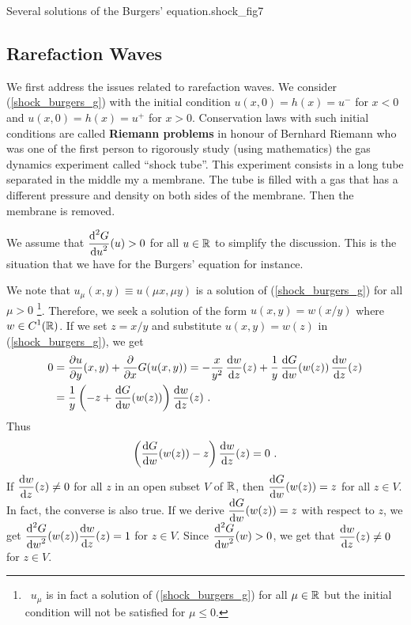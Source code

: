 {Several solutions of the Burgers' equation.}{shock_fig7}

\subsection{Rarefaction Waves} \label{subsectRarefW}

We first address the issues related to rarefaction waves.
We consider (\ref{shock_burgers_g}) with the initial condition
$\displaystyle u(x,0) = h(x) = u^-$ for $x<0$ and
$\displaystyle u(x,0) = h(x) = u^+$ for $x>0$.
Conservation laws with such initial conditions are called
{\bfseries Riemann problems}
in honour of Bernhard Riemann who was one of the first person to
rigorously study (using mathematics) the gas dynamics experiment
called ``shock tube''.  This experiment consists in a long tube
separated in the middle my a membrane.  The tube is filled with a gas
that has a different pressure and density on both sides of the
membrane.  Then the membrane is removed.

We assume that $\displaystyle \dydxn{G}{u}{2}(u) > 0$ for all $u\in
\RR$ to simplify the discussion.  This is the situation that we have
for the Burgers' equation for instance.

We note that $u_\mu(x,y) \equiv u(\mu x, \mu y)$ is a solution of
(\ref{shock_burgers_g}) for all $\mu >0$ \footnote{\ $u_\mu$ is in fact a
solution of (\ref{shock_burgers_g}) for all $\mu \in \RR$ but the
initial condition will not be satisfied for $\mu \leq 0$.}.
Therefore, we seek a solution of the form $u(x,y) = w(x/y)$ where
$\displaystyle w \in C^1(\RR)$.  If we set $z = x/y$ and
substitute $u(x,y) = w(z)$ in (\ref{shock_burgers_g}), we get
\begin{align*}
0 &= \pdydx{u}{y}(x,y) + \pdfdx{G(u(x,y))}{x}
= -\frac{x}{y^2}\, \dydx{w}{z}(z) + \frac{1}{y}\,\dydx{G}{w}(w(z))
\, \dydx{w}{z}(z)  \\
&= \frac{1}{y} \left( -z + \dydx{G}{w}(w(z)) \right) \dydx{w}{z}(z) \ .
\end{align*}
Thus
\[
\left(\dydx{G}{w}(w(z)) - z \right) \dydx{w}{z}(z) = 0 \ .
\]
If $\displaystyle \dydx{w}{z}(z) \neq 0$ for all $z$ in an open
subset $V$ of $\RR$, then
$\displaystyle \dydx{G}{w}(w(z)) = z$ for all $z\in V$.  In fact, the
converse is also true.  If we derive $\displaystyle \dydx{G}{w}(w(z)) = z$
with respect to $z$, we get
$\displaystyle \dydxn{G}{w}{2}(w(z))\dydx{w}{z}(z) = 1$ for $z\in V$.  Since
$\displaystyle \dydxn{G}{w}{2}(w) > 0$, we get that 
$\displaystyle \dydx{w}{z}(z) \neq 0$ for $z \in V$.


